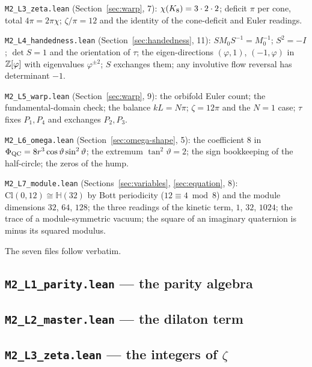\documentclass[11pt,a4paper]{article}
\theoremstyle{plain}
\theoremstyle{definition}
\theoremstyle{remark}
\newcommand{\Hquat}{\mathbb{H}}
\begin{document}
\texttt{M2\_L3\_zeta.lean} (Section~\ref{sec:warp}, 7): $\chi(K_8)=3\cdot2\cdot2$;
deficit $\pi$ per cone, total $4\pi=2\pi\chi$; $\zeta/\pi=12$ and the
identity of the cone-deficit and Euler readings.

\texttt{M2\_L4\_handedness.lean} (Section~\ref{sec:handedness}, 11):
$SM_{0}S^{-1}=M_{0}^{-1}$; $S^{2}=-I$; $\det S=1$ and the orientation of
$\tau$; the eigen-directions $(\varphi,1)$, $(-1,\varphi)$ in $\mathbb{Z}[\varphi]$
with eigenvalues $\varphi^{\pm2}$; $S$ exchanges them; any involutive flow
reversal has determinant $-1$.

\texttt{M2\_L5\_warp.lean} (Section~\ref{sec:warp}, 9): the orbifold Euler
count; the fundamental-domain check; the balance $kL=N\pi$; $\zeta=12\pi$
and the $N=1$ case; $\tau$ fixes $P_{1},P_{4}$ and exchanges $P_{2},P_{3}$.

\texttt{M2\_L6\_omega.lean} (Section~\ref{sec:omega-shape}, 5): the
coefficient $8$ in $\Phi_{\mathrm{QC}}=8r^{3}\cos\vartheta\sin^{2}\vartheta$; the
extremum $\tan^{2}\vartheta=2$; the sign bookkeeping of the half-circle; the
zeros of the hump.

\texttt{M2\_L7\_module.lean} (Sections~\ref{sec:variables}, \ref{sec:equation}, 8):
$\mathrm{Cl}(0,12)\cong\Hquat(32)$ by Bott periodicity ($12\equiv4\bmod8$) and
the module dimensions $32$, $64$, $128$; the three readings of the kinetic
term, $1$, $32$, $1024$; the trace of a module-symmetric vacuum; the square
of an imaginary quaternion is minus its squared modulus.

The seven files follow verbatim.

\subsection*{\texttt{M2\_L1\_parity.lean} --- the parity algebra}


\subsection*{\texttt{M2\_L2\_master.lean} --- the dilaton term}


\subsection*{\texttt{M2\_L3\_zeta.lean} --- the integers of $\zeta$}

\end{document}
